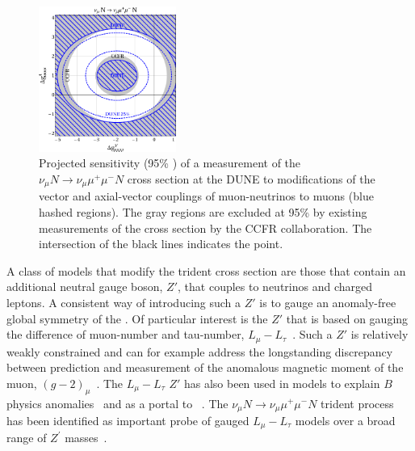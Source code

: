 \begin{figure}[tb!]
\centering
\includegraphics[width=0.4\textwidth]{graphics/model_independent_2.pdf}
\caption[Projected sensitivity of $\nu_\mu N \to \nu_\mu \mu^+\mu^- N$ cross section at the  to modifications of the vector and axial-vector couplings of \numu{}s to muons]{Projected sensitivity (95\% ) of a measurement of the $\nu_\mu N \to \nu_\mu \mu^+\mu^- N$ cross section at the DUNE  to modifications of the vector and axial-vector couplings of muon-neutrinos to muons (blue hashed regions). The gray regions are excluded at 95\%  by existing measurements of the cross section by the CCFR collaboration. The intersection of the black lines indicates the  point.}
\label{fig:trident_gVgA}
\end{figure}

A class of models that modify the trident cross section are those that contain an additional neutral gauge boson, $Z'$, that couples to neutrinos and charged leptons. A consistent way of introducing such a $Z'$ is to gauge an anomaly-free global symmetry of the . Of particular interest is the $Z'$ that is based on gauging the difference of muon-number and tau-number, $L_\mu - L_\tau$~\cite{He:1990pn,He:1991qd}. Such a $Z'$ is relatively weakly constrained and can for example address the longstanding discrepancy between  prediction and measurement of the anomalous magnetic moment of the muon, $(g-2)_\mu$~\cite{Baek:2001kca,Harigaya:2013twa}. The $L_\mu - L_\tau$ $Z'$ has also been used in models to explain $B$ physics anomalies~\cite{Altmannshofer:2014cfa} and as a portal to ~\cite{Baek:2008nz,Altmannshofer:2016jzy}. The $\nu_\mu N \to \nu_\mu \mu^+\mu^- N$ trident process has been identified as important probe of gauged $L_\mu - L_\tau$ models over a broad range of $Z^\prime$ masses~\cite{Altmannshofer:2014cfa,Altmannshofer:2014pba}.

